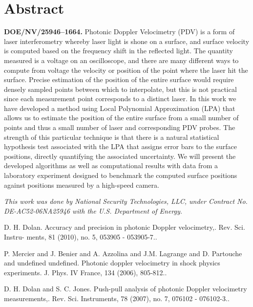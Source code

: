 \documentclass[article, A4, 11pt]{llncs}%
\begin{document}
\section*{Abstract}
{\bf{DOE/NV/25946--1664.}}  Photonic Doppler Velocimetry (PDV) is a form of laser interferometry whereby laser light is shone on a surface, and surface velocity is computed based on the frequency shift in the reflected light. The quantity measured is a voltage on an oscilloscope, and there are many different ways to compute from voltage the velocity or position of the point where the laser hit the surface. Precise estimation of the position of the entire surface would require densely sampled points between which to interpolate, but this is not practical since each measurement point corresponds to a distinct laser. In this work we have developed a method using Local Polynomial Approximation (LPA) that allows us to estimate the position of the entire surface from a small number of points and thus a small number of laser and corresponding PDV probes. The strength of this particular technique is that there is a natural statistical hypothesis test associated with the LPA that assigns error bars to the surface positions, directly quantifying the associated uncertainty. We will present the developed algorithms as well as computational results with data from a laboratory experiment designed to benchmark the computed surface positions against positions measured by a high-speed camera.

{\it This work was done by National Security Technologies, LLC, under Contract No. DE-AC52-06NA25946 with the U.S. Department of Energy.}


\begin{thebibliography}{10}
{\sc D. H. Dolan}. {Accuracy and precision in photonic Doppler velocimetry,}. Rev. Sci. Instru- ments, 81 (2010), no. 5, 053905 - 053905-7..

{\sc P. Mercier and J. Benier and A. Azzolina and J.M. Lagrange and D. Partouche and undefined undefined}. {Photonic doppler velocimetry in shock physics experiments}. J. Phys. IV France, 134 (2006), 805-812..

{\sc D. H. Dolan and S. C. Jones}. {Push-pull analysis of photonic Doppler velocimetry measurements,}. Rev. Sci. Instruments, 78 (2007), no. 7, 076102 - 076102-3..
\end{thebibliography} %
\end{document}
